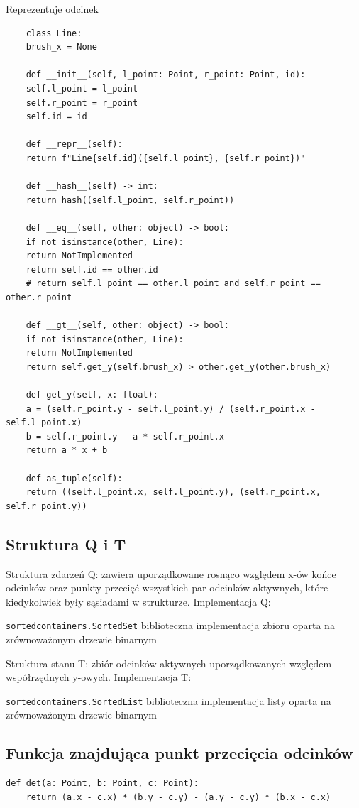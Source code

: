\documentclass[12pt]{article}
\begin{document}
		
\newpage
		\par Reprezentuje odcinek
\begin{Verbatim}
	class Line:
	brush_x = None
	
	def __init__(self, l_point: Point, r_point: Point, id):
	self.l_point = l_point
	self.r_point = r_point
	self.id = id
	
	def __repr__(self):
	return f"Line{self.id}({self.l_point}, {self.r_point})"
	
	def __hash__(self) -> int:
	return hash((self.l_point, self.r_point))
	
	def __eq__(self, other: object) -> bool:
	if not isinstance(other, Line):
	return NotImplemented
	return self.id == other.id
	# return self.l_point == other.l_point and self.r_point == other.r_point
	
	def __gt__(self, other: object) -> bool:
	if not isinstance(other, Line):
	return NotImplemented
	return self.get_y(self.brush_x) > other.get_y(other.brush_x)
	
	def get_y(self, x: float):
	a = (self.r_point.y - self.l_point.y) / (self.r_point.x - self.l_point.x)
	b = self.r_point.y - a * self.r_point.x
	return a * x + b
	
	def as_tuple(self):
	return ((self.l_point.x, self.l_point.y), (self.r_point.x, self.r_point.y))
\end{Verbatim}

\subsection*{Struktura Q i T}
\par Struktura zdarzeń Q:
zawiera uporządkowane rosnąco względem x-ów końce odcinków oraz punkty przecięć wszystkich par odcinków aktywnych, które kiedykolwiek były sąsiadami w strukturze.
\newline
Implementacja Q: 

\verb|sortedcontainers.SortedSet| biblioteczna implementacja zbioru oparta na zrównoważonym drzewie binarnym

\mbox{}

\par Struktura stanu T:
zbiór odcinków aktywnych uporządkowanych względem współrzędnych y-owych.
\newline
Implementacja T: 

\verb|sortedcontainers.SortedList| biblioteczna implementacja listy oparta na zrównoważonym drzewie binarnym

\newpage
\subsection*{Funkcja znajdująca punkt przecięcia odcinków}
\begin{Verbatim}
def det(a: Point, b: Point, c: Point):
	return (a.x - c.x) * (b.y - c.y) - (a.y - c.y) * (b.x - c.x)
\end{Verbatim}
\end{document}
